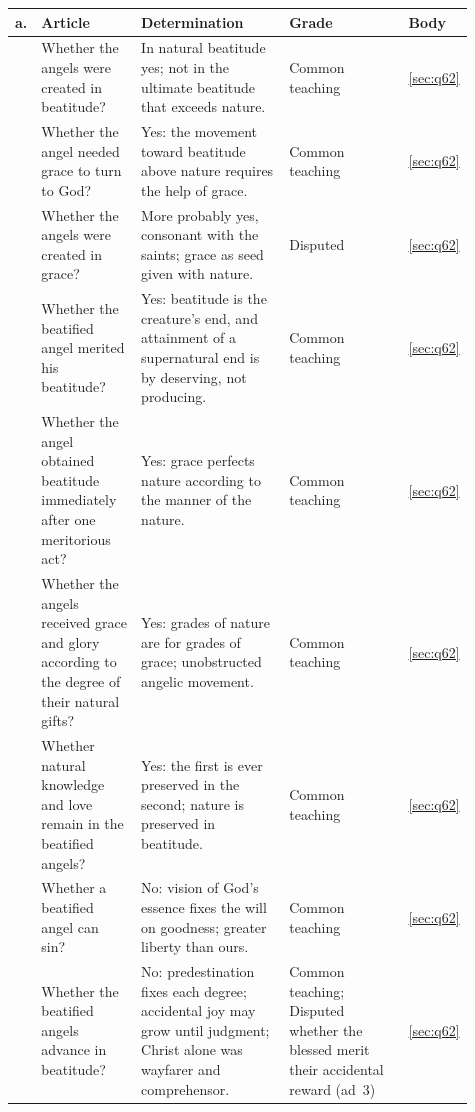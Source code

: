 \begingroup\footnotesize
\begin{longtable}{>{\raggedright\arraybackslash}p{0.03\linewidth}>{\raggedright\arraybackslash}p{0.22\linewidth}>{\raggedright\arraybackslash}p{0.33\linewidth}>{\raggedright\arraybackslash}p{0.27\linewidth}>{\raggedright\arraybackslash}p{0.06\linewidth}}
\toprule
\textbf{a.} & \textbf{Article} & \textbf{Determination} & \textbf{Grade} & \textbf{Body}\\
\midrule
\endhead
1 & Whether the angels were created in beatitude? & In natural beatitude yes; not in the ultimate beatitude that exceeds nature. & Common teaching & \ref{sec:q62}\\
2 & Whether the angel needed grace to turn to God? & Yes: the movement toward beatitude above nature requires the help of grace. & Common teaching & \ref{sec:q62}\\
3 & Whether the angels were created in grace? & More probably yes, consonant with the saints; grace as seed given with nature. & Disputed & \ref{sec:q62}\\
4 & Whether the beatified angel merited his beatitude? & Yes: beatitude is the creature's end, and attainment of a supernatural end is by deserving, not producing. & Common teaching & \ref{sec:q62}\\
5 & Whether the angel obtained beatitude immediately after one meritorious act? & Yes: grace perfects nature according to the manner of the nature. & Common teaching & \ref{sec:q62}\\
6 & Whether the angels received grace and glory according to the degree of their natural gifts? & Yes: grades of nature are for grades of grace; unobstructed angelic movement. & Common teaching & \ref{sec:q62}\\
7 & Whether natural knowledge and love remain in the beatified angels? & Yes: the first is ever preserved in the second; nature is preserved in beatitude. & Common teaching & \ref{sec:q62}\\
8 & Whether a beatified angel can sin? & No: vision of God's essence fixes the will on goodness; greater liberty than ours. & Common teaching & \ref{sec:q62}\\
9 & Whether the beatified angels advance in beatitude? & No: predestination fixes each degree; accidental joy may grow until judgment; Christ alone was wayfarer and comprehensor. & Common teaching; Disputed whether the blessed merit their accidental reward (ad~3) & \ref{sec:q62}\\
\bottomrule
\end{longtable}
\endgroup

